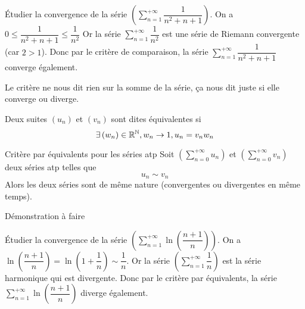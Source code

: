 \documentclass[a4paper, 12pt]{article}
\begin{document}
\begin{exemple}
    Étudier la convergence de la série $\left(\sum\limits_{n=1}^{+\infty} \dfrac{1}{n^2 + n + 1}\right)$.
    \newline
    On a $0 \leq \dfrac{1}{n^2 + n + 1} \leq \dfrac{1}{n^2}$
    Or la série $\sum\limits_{n=1}^{+\infty} \dfrac{1}{n^2}$ est une série de Riemann convergente (car $2 \gt 1$).
    Donc par le critère de comparaison, la série $\sum\limits_{n=1}^{+\infty} \dfrac{1}{n^2 + n + 1}$ converge également.
\end{exemple}

\begin{remarque}
    Le critère ne nous dit rien sur la somme de la série, ça nous dit juste si elle converge ou diverge.
\end{remarque}

\begin{definition}
    Deux suites $\left( u_n \right)$ et $\left( v_n \right)$ sont dites équivalentes si
    $$
    \exists \left( w_n \right) \in \mathbb{R}^{\mathbb{N}}, w_n \rightarrow 1, u_n = v_n w_n
    $$
\end{definition}

\begin{proposition}{Critère par équivalents pour les séries atp}{}
    Soit $\left( \sum\limits_{n=0}^{+\infty} u_n \right)$ et $\left( \sum\limits_{n=0}^{+\infty} v_n \right)$ deux séries atp telles que
    $$
    u_n \sim v_n
    $$
    Alors les deux séries sont de même nature (convergentes ou divergentes en même temps).
\end{proposition}

\begin{hotwarn}
    Démonstration à faire
\end{hotwarn}

\begin{exemple}
    Étudier la convergence de la série $\left( \sum\limits_{n=1}^{+\infty} \ln\left( \dfrac{n+1}{n} \right) \right)$.
    \newline
    On a $\ln\left( \dfrac{n+1}{n} \right) = \ln\left( 1 + \dfrac{1}{n} \right) \sim \dfrac{1}{n}$.
    Or la série $\left(\sum\limits_{n=1}^{+\infty} \dfrac{1}{n}\right)$ est la série harmonique qui est divergente.
    Donc par le critère par équivalents, la série $\sum\limits_{n=1}^{+\infty} \ln\left( \dfrac{n+1}{n} \right)$ diverge également.
\end{exemple}
\end{document}

